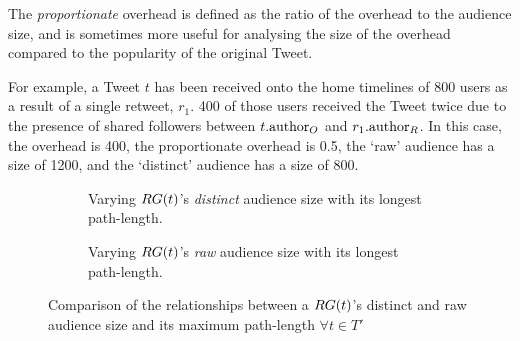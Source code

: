  The \textit{proportionate} overhead is defined as the ratio of the overhead to the audience size, and is sometimes more useful for analysing the size of the overhead compared to the popularity of the original Tweet.

For example, a Tweet $t$ has been received onto the home timelines of 800 users as a result of a single retweet, $r_1$. 400 of those users received the Tweet twice due to the presence of shared followers between $t.\textrm{author}_O$ and $r_1.\textrm{author}_R$. In this case, the overhead is 400, the proportionate overhead is 0.5, the `raw'  audience has a size of 1200, and the `distinct' audience has a size of 800.

\begin{figure}[h]
\begin{subfigure}{.5\textwidth}
    \centering
    \caption{Varying $RG(t)$'s \textit{distinct} audience size with its longest path-length.}
    \label{fig:pathlength-audience}
\end{subfigure}
\quad
\begin{subfigure}{.5\textwidth}
    \centering
    \caption{Varying $RG(t)$'s \textit{raw} audience size with its longest path-length.}
    \label{fig:pathlength-rawaudience}
\end{subfigure}
\caption{Comparison of the relationships between a $RG(t)$'s distinct and raw audience size and its maximum path-length $\forall t \in T'$}
\end{figure}

